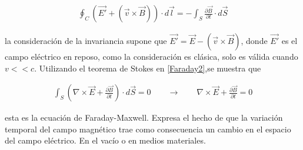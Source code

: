 \begin{eqnarray}
    \oint_{C} \left(\vec{E'} + (\vec{v}\times \vec{B})\right)\cdot d\vec{l} = -\int_{S}\frac{\partial \vec{B}}{\partial t}\cdot d\vec{S}
\end{eqnarray}

\noindent la consideración de la invariancia supone que $\vec{E'} = \vec{E} -( \vec{v}\times \vec{B})$, donde $\vec{E'}$ es el campo eléctrico en reposo, como la consideración es clásica, solo es válida cuando $v << c$. Utilizando el teorema de Stokes \cite{Arfken} en \eqref{Faraday2},se muestra que 

\begin{eqnarray}
\label{FM}
    \int_{S}\left(\nabla \times \vec{E}+\frac{\partial\vec{B}}{\partial t}\right)\cdot d\vec{S} =0 \qquad \longrightarrow \qquad \boxed{\nabla \times \vec{E} + \frac{\partial \vec{B}}{\partial t} = 0}
\end{eqnarray}

\noindent esta es la ecuación de Faraday-Maxwell. Expresa el hecho de que la variación temporal del campo magnético trae como consecuencia un cambio en el espacio del campo eléctrico. En el vacío o en medios materiales.

